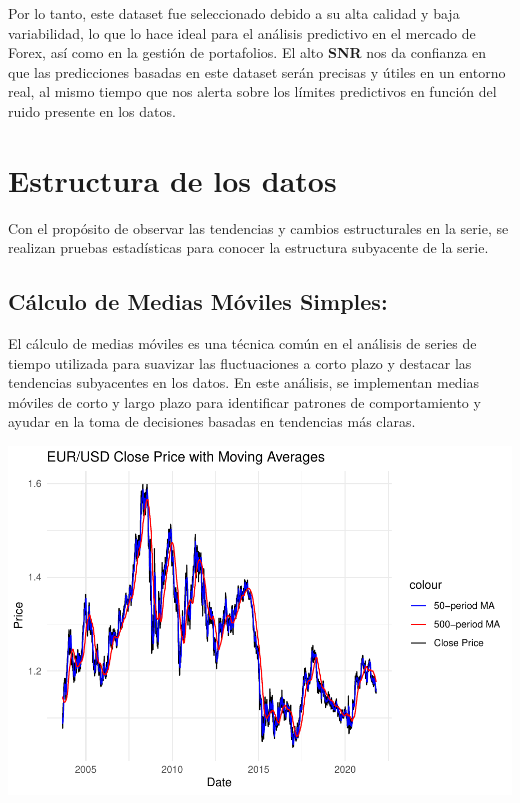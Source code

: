 \documentclass[
]{book}
\begin{document}
Por lo tanto, este dataset fue seleccionado debido a su alta calidad y baja variabilidad, lo que lo hace ideal para el análisis predictivo en el mercado de Forex, así como en la gestión de portafolios. El alto \textbf{SNR} nos da confianza en que las predicciones basadas en este dataset serán precisas y útiles en un entorno real, al mismo tiempo que nos alerta sobre los límites predictivos en función del ruido presente en los datos.

\chapter{Estructura de los datos}\label{intro}

Con el propósito de observar las tendencias y cambios estructurales en la serie, se realizan pruebas estadísticas para conocer la estructura subyacente de la serie.

\section{Cálculo de Medias Móviles Simples:}\label{cuxe1lculo-de-medias-muxf3viles-simples}

El cálculo de medias móviles es una técnica común en el análisis de series de tiempo utilizada para suavizar las fluctuaciones a corto plazo y destacar las tendencias subyacentes en los datos. En este análisis, se implementan medias móviles de corto y largo plazo para identificar patrones de comportamiento y ayudar en la toma de decisiones basadas en tendencias más claras.

\includegraphics{bookdown_time_series_files/figure-latex/unnamed-chunk-3-1.pdf}
\end{document}
